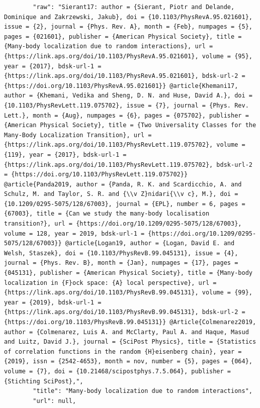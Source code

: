 \documentclass[11pt]{article}
\begin{document}
\begin{verbatim}
        "raw": "Sierant17: author = {Sierant, Piotr and Delande, Dominique and Zakrzewski, Jakub}, doi = {10.1103/PhysRevA.95.021601}, issue = {2}, journal = {Phys. Rev. A}, month = {Feb}, numpages = {5}, pages = {021601}, publisher = {American Physical Society}, title = {Many-body localization due to random interactions}, url = {https://link.aps.org/doi/10.1103/PhysRevA.95.021601}, volume = {95}, year = {2017}, bdsk-url-1 = {https://link.aps.org/doi/10.1103/PhysRevA.95.021601}, bdsk-url-2 = {https://doi.org/10.1103/PhysRevA.95.021601}} @article{Khemani17, author = {Khemani, Vedika and Sheng, D. N. and Huse, David A.}, doi = {10.1103/PhysRevLett.119.075702}, issue = {7}, journal = {Phys. Rev. Lett.}, month = {Aug}, numpages = {6}, pages = {075702}, publisher = {American Physical Society}, title = {Two Universality Classes for the Many-Body Localization Transition}, url = {https://link.aps.org/doi/10.1103/PhysRevLett.119.075702}, volume = {119}, year = {2017}, bdsk-url-1 = {https://link.aps.org/doi/10.1103/PhysRevLett.119.075702}, bdsk-url-2 = {https://doi.org/10.1103/PhysRevLett.119.075702}} @article{Panda2019, author = {Panda, R. K. and Scardicchio, A. and Schulz, M. and Taylor, S. R. and {\\v Z}nidari{\\v c}, M.}, doi = {10.1209/0295-5075/128/67003}, journal = {EPL}, number = 6, pages = {67003}, title = {Can we study the many-body localisation transition?}, url = {https://doi.org/10.1209/0295-5075/128/67003}, volume = 128, year = 2019, bdsk-url-1 = {https://doi.org/10.1209/0295-5075/128/67003}} @article{Logan19, author = {Logan, David E. and Welsh, Staszek}, doi = {10.1103/PhysRevB.99.045131}, issue = {4}, journal = {Phys. Rev. B}, month = {Jan}, numpages = {17}, pages = {045131}, publisher = {American Physical Society}, title = {Many-body localization in {F}ock space: {A} local perspective}, url = {https://link.aps.org/doi/10.1103/PhysRevB.99.045131}, volume = {99}, year = {2019}, bdsk-url-1 = {https://link.aps.org/doi/10.1103/PhysRevB.99.045131}, bdsk-url-2 = {https://doi.org/10.1103/PhysRevB.99.045131}} @Article{Colmenarez2019, author = {Colmenarez, Luis A. and McClarty, Paul A. and Haque, Masud and Luitz, David J.}, journal = {SciPost Physics}, title = {Statistics of correlation functions in the random {H}eisenberg chain}, year = {2019}, issn = {2542-4653}, month = nov, number = {5}, pages = {064}, volume = {7}, doi = {10.21468/scipostphys.7.5.064}, publisher = {Stichting SciPost},",
        "title": "Many-body localization due to random interactions",
        "url": null,

\end{verbatim}
\end{document}
